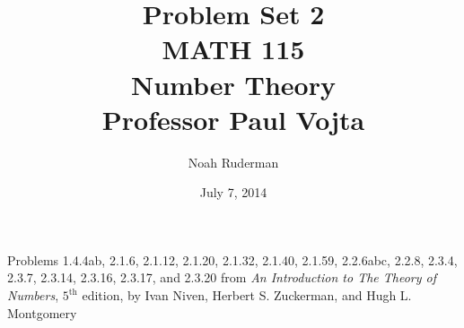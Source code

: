 \documentclass[12 pt]{amsart}
\begin{document}
\allowdisplaybreaks
\title
[Problem Set 2]
{Problem Set 2 \\
MATH 115 \\
Number Theory \\
Professor Paul Vojta}

\author{Noah Ruderman}

\date{ July 7, 2014}

\maketitle
\begin{center}
	Problems 1.4.4ab, 2.1.6, 2.1.12, 2.1.20, 2.1.32, 2.1.40, 2.1.59, 2.2.6abc, 
  2.2.8, 2.3.4, 2.3.7, 2.3.14, 2.3.16, 2.3.17, and 2.3.20 
	from \emph{An Introduction to The Theory of Numbers}, 
	$5^{\text{th}}$ edition,
	by Ivan Niven, Herbert S. Zuckerman, and Hugh L. Montgomery 
\end{center}
\end{document}
